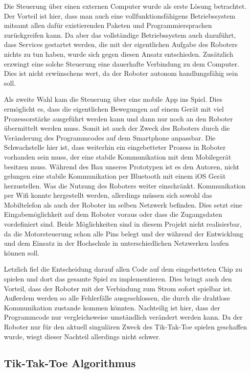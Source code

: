 \documentclass[conference,compsoc,final,a4paper]{IEEEtran}
\begin{document}
Die Steuerung über einen externen Computer wurde als erste Lösung betrachtet. Der Vorteil
ist hier, dass man auch eine vollfunktionsfähigens Betriebssystem mitsamt allen dafür existierenden
Paketen und Programmiersprachen zurückgreifen kann. Da aber das vollständige Betriebssystem auch
dazuführt, dass Services gestartet werden, die mit der eigentlichen Aufgabe des Roboters nichts zu
tun haben, wurde sich gegen diesen Ansatz entschieden. Zusätzlich erzwingt eine solche Steuerung
eine dauerhafte Verbindung zu dem Computer. Dies ist nicht erwünschens wert, da der Roboter autonom
handlungsfähig sein soll.

Als zweite Wahl kam die Steuerung über eine mobile App ins Spiel. Dies ermöglicht es, dass die
eigentlichen Bewegungen auf einem Gerät mit viel Prozessorstärke ausgeführt werden kann und dann nur
noch an den Roboter übermittelt werden muss. Somit ist auch der Zweck des Roboters
durch die Veränderung des Programmcodes auf dem Smartphone anpassbar. Die Schwachstelle hier ist,
dass weiterhin ein eingebetteter Prozess in Roboter vorhanden sein muss, der eine stabile
Kommunikation mit dem Mobilegerät besitzen muss. Während des Bau unseres Prototypen ist es den Autoren,
nicht gelungen eine stabile Kommunikation per Bluetooth mit einem iOS Gerät herzustellen.
Was die Nutzung des Roboters weiter einschränkt. Kommunikation per Wifi konnte hergestellt werden,
allerdings müssen sich sowohl das Mobiltelefon als auch der Roboter im 
selben Netzwerk befinden. Dies setzt eine Eingabemöglichkeit auf dem Roboter voraus oder dass
die Zugangsdaten vordefiniert sind. Beide Möglichkeiten sind in diesem Projekt nicht realisierbar,
da die Motorsteuerung schon alle Pins belegt und der während der Entwicklung und dem Einsatz in der
Hochschule in unterschiedlichen Netzwerken laufen können soll.

Letzlich fiel die Entscheidung darauf allen Code auf dem eingebetteten Chip zu spielen und dort
das gesamte Spiel zu implementieren. Dies bringt auch den Vorteil, dass der Roboter mit der Verbindung
zum Strom sofort spielbar ist. Außerdem werden so alle Fehlerfälle ausgeschlossen, die durch die
drahtlose Kommunikation zustande kommen könnten. Nachteilig ist hier, dass der Programmcode nur
vergleichsweise umständlich verändert werden kann. Da der Roboter nur für den aktuell singulären
Zweck des Tik-Tak-Toe spielen geschaffen wurde, wiegt dieser Nachteil allerdings nicht schwer.

\subsection{Tik-Tak-Toe Algorithmus}
\end{document}
